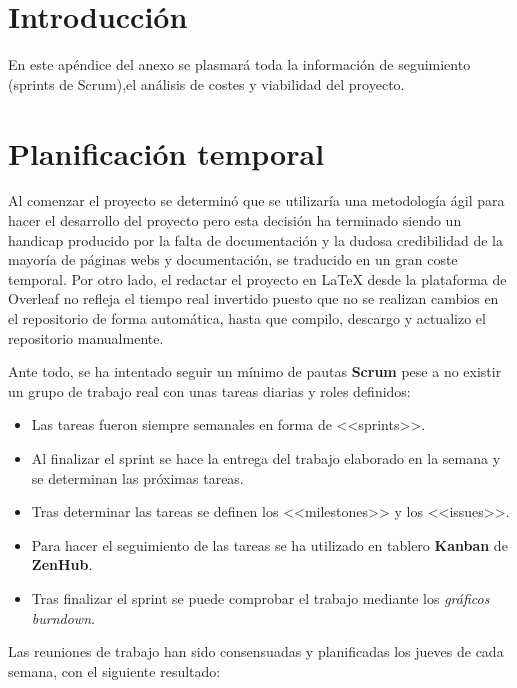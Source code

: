 
\section{Introducción}
En este apéndice del anexo se plasmará toda la información de seguimiento (sprints de Scrum),el análisis de costes y viabilidad del proyecto.


\section{Planificación temporal}
Al comenzar el proyecto se determinó que se utilizaría una metodología ágil para hacer el desarrollo del proyecto pero esta decisión ha terminado siendo un handicap producido por la falta de documentación y la dudosa credibilidad de la mayoría de páginas webs y documentación, se traducido en un gran coste temporal.
Por otro lado, el redactar el proyecto en \LaTeX{} desde la plataforma de Overleaf no refleja el tiempo real invertido puesto que no se realizan cambios en el repositorio de forma automática, hasta que compilo, descargo y actualizo el repositorio manualmente.

Ante todo, se ha intentado seguir un mínimo de pautas \textbf{Scrum} pese a no existir un grupo de trabajo real con unas tareas diarias y roles definidos:
\begin{itemize}
    \item Las tareas fueron siempre semanales en forma de <<sprints>>.
    \item Al finalizar el sprint se hace la entrega del trabajo elaborado en la semana y se determinan las próximas tareas.
    \item Tras determinar las tareas se definen los <<milestones>> y los <<issues>>.
    \item Para hacer el seguimiento de las tareas se ha utilizado en tablero \textbf{Kanban} de \textbf{ZenHub}.
    \item Tras finalizar el sprint se puede comprobar el trabajo mediante los  \textit{gráficos burndown}.
\end{itemize}

Las reuniones de trabajo han sido consensuadas y planificadas los jueves de cada semana, con el siguiente resultado:

